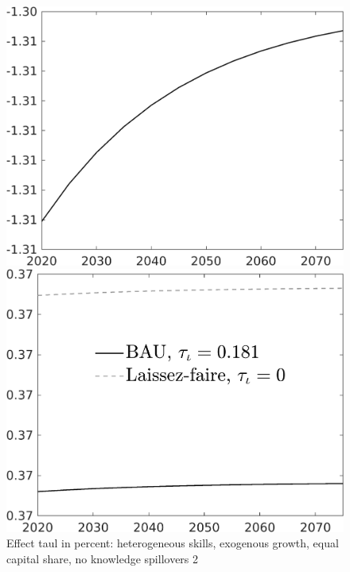 \documentclass[12pt]{article}
\begin{document}
\begin{figure}[h!!]
	\centering
	\caption{Effect taul in percent: heterogeneous skills, exogenous growth, equal capital share, no knowledge spillovers 2}\label{fig:LF_BAU_nsk0_xgr1_equalcapShare_noknow2}
		
	\begin{minipage}[]{0.32\textwidth}
		\includegraphics[width=1\textwidth]{../../codding_model/own_basedOnFried/optimalPol_010922_revision/figures/all_13Sept22/CompTaul_Equlab_LFBAUPer_Reg0_LgLf_spillover0_nsk0_xgr1_knspil1_sep1_countec0_GovRev0_etaa0.79.png}
	\end{minipage}	
	\begin{minipage}[]{0.32\textwidth}
		\includegraphics[width=1\textwidth]{../../codding_model/own_basedOnFried/optimalPol_010922_revision/figures/all_13Sept22/CompTaul_Equlab_LFBAU_Reg0_LgLf_spillover0_nsk0_xgr1_knspil1_sep1_countec0_GovRev0_etaa0.79_lgd1.png}

\end{minipage}
\end{figure}
\end{document}
